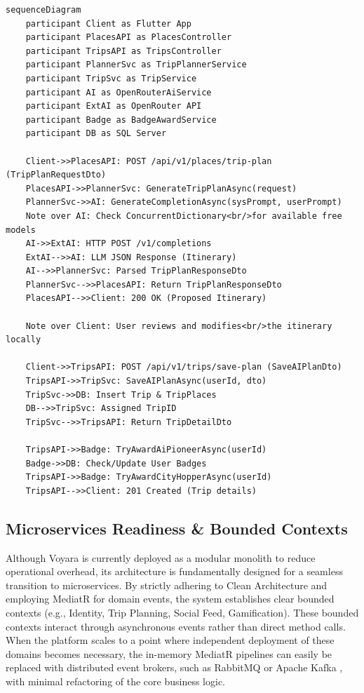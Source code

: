 \begin{verbatim}
sequenceDiagram
    participant Client as Flutter App
    participant PlacesAPI as PlacesController
    participant TripsAPI as TripsController
    participant PlannerSvc as TripPlannerService
    participant TripSvc as TripService
    participant AI as OpenRouterAiService
    participant ExtAI as OpenRouter API
    participant Badge as BadgeAwardService
    participant DB as SQL Server

    Client->>PlacesAPI: POST /api/v1/places/trip-plan (TripPlanRequestDto)
    PlacesAPI->>PlannerSvc: GenerateTripPlanAsync(request)
    PlannerSvc->>AI: GenerateCompletionAsync(sysPrompt, userPrompt)
    Note over AI: Check ConcurrentDictionary<br/>for available free models
    AI->>ExtAI: HTTP POST /v1/completions
    ExtAI-->>AI: LLM JSON Response (Itinerary)
    AI-->>PlannerSvc: Parsed TripPlanResponseDto
    PlannerSvc-->>PlacesAPI: Return TripPlanResponseDto
    PlacesAPI-->>Client: 200 OK (Proposed Itinerary)
    
    Note over Client: User reviews and modifies<br/>the itinerary locally
    
    Client->>TripsAPI: POST /api/v1/trips/save-plan (SaveAIPlanDto)
    TripsAPI->>TripSvc: SaveAIPlanAsync(userId, dto)
    TripSvc->>DB: Insert Trip & TripPlaces
    DB-->>TripSvc: Assigned TripID
    TripSvc-->>TripsAPI: Return TripDetailDto
    
    TripsAPI->>Badge: TryAwardAiPioneerAsync(userId)
    Badge->>DB: Check/Update User Badges
    TripsAPI->>Badge: TryAwardCityHopperAsync(userId)
    TripsAPI-->>Client: 201 Created (Trip details)
\end{verbatim}

\subsection{Microservices Readiness \& Bounded Contexts}
Although Voyara is currently deployed as a modular monolith to reduce operational overhead, its architecture is fundamentally designed for a seamless transition to microservices. By strictly adhering to Clean Architecture \cite{cleanarchitecture} and employing MediatR \cite{mediatr} for domain events, the system establishes clear bounded contexts (e.g., Identity, Trip Planning, Social Feed, Gamification). These bounded contexts interact through asynchronous events rather than direct method calls. When the platform scales to a point where independent deployment of these domains becomes necessary, the in-memory MediatR pipelines can easily be replaced with distributed event brokers, such as RabbitMQ \cite{rabbitmq} or Apache Kafka \cite{kafka}, with minimal refactoring of the core business logic.

